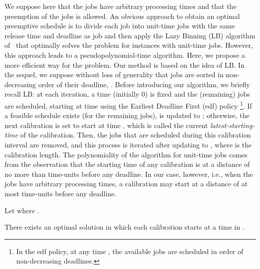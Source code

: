 We suppose here that the jobs have arbitrary processing times and that the preemption of the jobs is allowed. An obvious approach to obtain an optimal preemptive schedule is to divide each job  into  unit-time jobs with the same release time and deadline as job  and then apply the Lazy Binning (LB) algorithm of~\cite{bender2013efficient} that optimally solves the problem for instances with unit-time jobs. However,  this approach leads to a pseudopolynomial-time algorithm. Here, we propose a more efficient way for the problem. Our method is based on the idea of LB. In the sequel, we suppose without loss of generality that jobs are sorted in non-decreasing order of their deadline, . Before introducing our algorithm, we briefly recall LB:
at each iteration, a time  (initially 0) is fixed and the (remaining) jobs are scheduled, starting at time  using the Earliest Deadline First {\sc (edf)} policy \footnote{In the {\sc edf} policy, at any time , the available jobs are scheduled in order of non-decreasing deadlines.}. 
If a feasible schedule exists (for the remaining jobs),  is updated to ; otherwise, the next calibration is set to start at time , which is called the current {\em latest-starting-time} of the calibration. Then, the jobs that are scheduled during this calibration interval are removed, and this process is iterated after updating  to , where  is the calibration length. The polynomiality of the algorithm for unit-time jobs comes from the observation that the starting time of any calibration is at a distance of no more than   time-units before any deadline.
In our case, however, i.e., when the jobs have arbitrary processing times, a calibration may start at a distance of at most   time-units before any deadline.




\begin{definition}\label{def:psi}
Let  where .
\end{definition}

\begin{prop}\label{prop:position_calibration}
There exists an optimal solution in which each calibration starts at a time in .
\end{prop}

